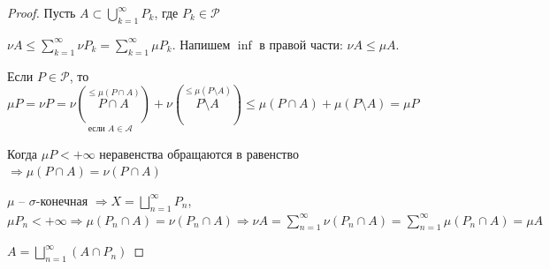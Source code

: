 \begin{proof}
    Пусть $A\subset \bigcup\limits_{k=1}^\infty P_k$, где $P_k\in\mathcal{P}$

    $\nu A \leq \sum\limits_{k=1}^\infty \nu P_k=\sum\limits_{k=1}^\infty \mu P_k$. Напишем $\inf$ в правой части: $\nu A\leq \mu A$.

    Если $P\in\mathcal{P}$, то $\mu P = \nu P=\underset{\text{если }A\in\mathcal{A}}{\nu (\overset{\leq \mu (P\cap A)}{P\cap A})}+\nu (\overset{\leq \mu (P\setminus A)}{P\setminus A})\leq \mu (P\cap A)+\mu (P\setminus A)= \mu P$

    Когда $\mu P<+\infty$ неравенства обращаются в равенство $\Rightarrow \mu (P\cap A) = \nu(P\cap A)$

    $\mu$ – $\sigma$-конечная $\Rightarrow X= \bigsqcup \limits_{n=1}^\infty P_n$, $\mu P_n <+\infty\Rightarrow
    \mu (P_n \cap A)= \nu (P_n \cap A)\Rightarrow \nu A = 
    \sum \limits_{n=1}^\infty \nu (P_n \cap A)=\sum \limits_{n=1}^\infty \mu (P_n \cap A)=\mu A$

    $A= \bigsqcup \limits_{n=1}^\infty (A \cap P_n)$
\end{proof}